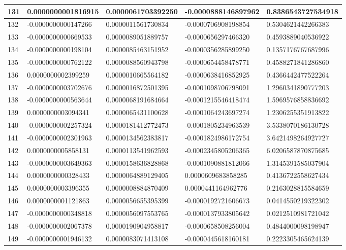 \begin{center}
\begin{longtable}{|p{0.5cm}|p{3.5cm}|p{3.5cm}|p{3.5cm}|p{3.5cm}|}
\hline
131  & 0.0000000001816915  & 0.0000061703392250  & -0.0000888146897962  & 0.8386543727534918\\
\hline
132  & -0.0000000000147266  & 0.0000011561730834  & -0.0000706908198854  & 0.5304621442266383\\
\hline
133  & -0.0000000000669533  & 0.0000089051889757  & -0.0000656297466320  & 0.4593889040536922\\
\hline
134  & -0.0000000000198104  & 0.0000085463151952  & -0.0000356285899250  & 0.1357176767687996\\
\hline
135  & -0.0000000000762122  & 0.0000088560943798  & -0.0000654458478771  & 0.4588271841286860\\
\hline
136  & 0.0000000002399259  & 0.0000010665564182  & -0.0000638416852925  & 0.4366442477522264\\
\hline
137  & -0.0000000003702676  & 0.0000016872501395  & -0.0001098706798091  & 1.2960341890777203\\
\hline
138  & -0.0000000000563644  & 0.0000068191684664  & -0.0001215546418474  & 1.5969576858836692\\
\hline
139  & 0.0000000003094341  & 0.0000065431100628  & -0.0001064243697274  & 1.2306255351913822\\
\hline
140  & -0.0000000002257324  & 0.0000181412772473  & -0.0001805234963539  & 3.5338070186130728\\
\hline
141  & -0.0000000002301963  & 0.0000134562383817  & -0.0001824986172754  & 3.6421498264927727\\
\hline
142  & 0.0000000005858131  & 0.0000113541962593  & -0.0002345805206365  & 6.0206587870875685\\
\hline
143  & -0.0000000003649363  & 0.0000158636828868  & -0.0001090881812066  & 1.3145391585037904\\
\hline
144  & 0.0000000000328433  & 0.0000064889129405  & 0.0000609683858285  & 0.4136722558627434\\
\hline
145  & 0.0000000003396355  & 0.0000008884870409  & 0.0000441164962776  & 0.2163028815584659\\
\hline
146  & 0.0000000001121863  & 0.0000056655395399  & -0.0000192721606673  & 0.0414550219322302\\
\hline
147  & -0.0000000000348818  & 0.0000056097553765  & -0.0000137933805642  & 0.0212510981721042\\
\hline
148  & -0.0000000002067378  & 0.0000190904958817  & -0.0000658508256004  & 0.4844000098198947\\
\hline
149  & -0.0000000001946132  & 0.0000083071413108  & -0.0000445618160181  & 0.2223305465624139\\

\end{longtable}
\end{center}
